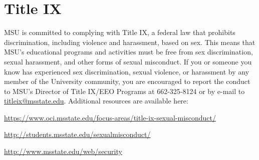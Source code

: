 \section{Title IX}

MSU is committed to complying with Title IX, a federal law that prohibits discrimination, including violence and harassment, based on sex.  This means that MSU’s educational programs and activities must be free from sex discrimination, sexual harassment, and other forms of sexual misconduct.  If you or someone you know has experienced sex discrimination, sexual violence, or harassment by any member of the University community, you are encouraged to report the conduct to MSU’s Director of Title IX/EEO Programs at 662-325-8124 or by e-mail to \url{titleix@msstate.edu}. Additional resources are available here:
\begin{description}
\item \url{https://www.oci.msstate.edu/focus-areas/title-ix-sexual-misconduct/}
\item \url{http://students.msstate.edu/sexualmisconduct/}  
\item \url{http://www.msstate.edu/web/security}
\end{description}